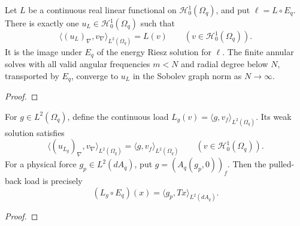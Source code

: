 \begin{theorem}
\label{thm:annular-sobolev-solve}
\leanok
Let $L$ be a continuous real linear functional on $\mathcal H_0^1(\Omega_q)$,
and put $\ell=L\circ E_q$. There is exactly one $u_L\in\mathcal H_0^1(\Omega_q)$
such that
\[
 \langle(u_L)_\nabla,v_\nabla\rangle_{L^2(\Omega_q)}=L(v)
 \qquad(v\in\mathcal H_0^1(\Omega_q)).
\]
It is the image under $E_q$ of the energy Riesz solution for $\ell$.
The finite annular solves with all valid angular frequencies $m<N$ and radial
degree below $N$, transported by $E_q$, converge to $u_L$ in the Sobolev graph
norm as $N\to\infty$.
\end{theorem}
\begin{proof}
\leanok
\end{proof}

\begin{theorem}
\label{thm:annular-sobolev-body-forcing}
\leanok
For $g\in L^2(\Omega_q)$, define the continuous load
$L_g(v)=\langle g,v_f\rangle_{L^2(\Omega_q)}$. Its weak solution satisfies
\[
 \langle(u_{L_g})_\nabla,v_\nabla\rangle_{L^2(\Omega_q)}
 =\langle g,v_f\rangle_{L^2(\Omega_q)}
 \qquad(v\in\mathcal H_0^1(\Omega_q)).
\]
For a physical force $g_p\in L^2(dA_q)$, put
$g=(A_q(g_p,0))_f$. Then the pulled-back load is precisely
\[
 (L_g\circ E_q)(x)=\langle g_p,Tx\rangle_{L^2(dA_q)}.
\]
\end{theorem}
\begin{proof}
\leanok
\end{proof}

